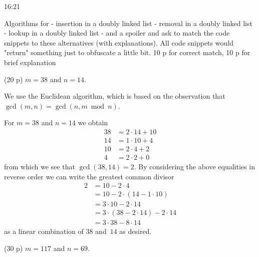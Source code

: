 \documentclass{jn-pset}
\begin{document}
\begin{problem}
  16:21


  
  Algorithms for
- insertion in a doubly linked list
- removal in a doubly linked list
- lookup in a doubly linked list
- and a spoiler
and ask to match the code snippets to these alternatives (with explanations).
All code snippets would "return" something just to obfuscate a little bit.
10 p for correct match, 10 p for brief explanation

  
  
\begin{subproblem}%
  {(20 p)}
  {\ignorespaces}
  $m = 38$ and $n=14$.
\end{subproblem}

\begin{solution}
  We use the Euclidean algorithm, which is based on the observation
  that
  $
  \gcd (m, n) 
  =
  \gcd (n, m \bmod n) 
  $.
  
  For
  $m = 38$
  and
  $n = 14$
  we obtain
  \begin{align*}   
    38 &= 2 \cdot 14 + 10 \\
    14 &= 1 \cdot 10 +  4 \\
    10 &= 2 \cdot  4 +  2 \\
    4  &= 2 \cdot  2 +  0
  \end{align*}
  from which we see that 
  $
  \gcd (38, 14) = 2
  $.
  By considering the above equalities in reverse order we
  can write the greatest common divisor
  \begin{align*}
    2 &=
        10 -  2 \cdot 4
    \\
      &=
        10 -  2 \cdot ( 14 - 1 \cdot 10 )
    \\
      &=
        3 \cdot 10 -  2 \cdot  14 
    \\
      &=
        3 \cdot
        ( 38 - 2 \cdot 14  )
        -  2 \cdot  14 
    \\
      &=
        3 \cdot 38
        -  8 \cdot  14
  \end{align*}
  as a linear combination of
  $38$ and~$14$ as desired.
\end{solution}


\begin{subproblem}%
  {(30 p)}
  {\ignorespaces}
  $m = 117$ and $n=69$.
\end{subproblem}


\end{problem}
\end{document}

